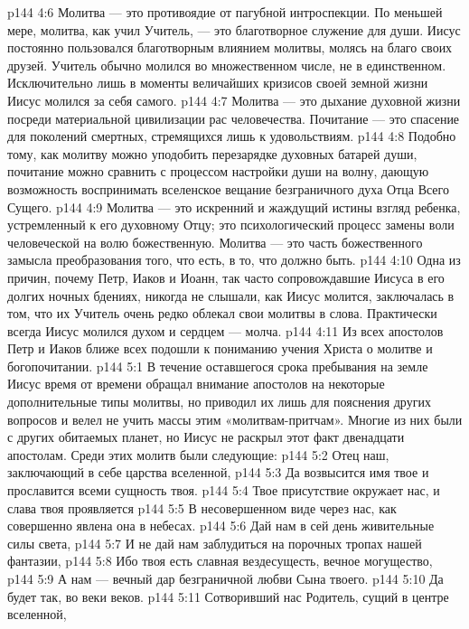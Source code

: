 \vs p144 4:6 Молитва --- это противоядие от пагубной интроспекции. По меньшей мере, молитва, как учил Учитель, --- это благотворное служение для души. Иисус постоянно пользовался благотворным влиянием молитвы, молясь на благо своих друзей. Учитель обычно молился во множественном числе, не в единственном. Исключительно лишь в моменты величайших кризисов своей земной жизни Иисус молился за себя самого.
\vs p144 4:7 Молитва --- это дыхание духовной жизни посреди материальной цивилизации рас человечества. Почитание --- это спасение для поколений смертных, стремящихся лишь к удовольствиям.
\vs p144 4:8 Подобно тому, как молитву можно уподобить перезарядке духовных батарей души, почитание можно сравнить с процессом настройки души на волну, дающую возможность воспринимать вселенское вещание безграничного духа Отца Всего Сущего.
\vs p144 4:9 Молитва --- это искренний и жаждущий истины взгляд ребенка, устремленный к его духовному Отцу; это психологический процесс замены воли человеческой на волю божественную. Молитва --- это часть божественного замысла преобразования того, что есть, в то, что должно быть.
\vs p144 4:10 Одна из причин, почему Петр, Иаков и Иоанн, так часто сопровождавшие Иисуса в его долгих ночных бдениях, никогда не слышали, как Иисус молится, заключалась в том, что их Учитель очень редко облекал свои молитвы в слова. Практически всегда Иисус молился духом и сердцем --- молча.
\vs p144 4:11 Из всех апостолов Петр и Иаков ближе всех подошли к пониманию учения Христа о молитве и богопочитании.
\vs p144 5:1 В течение оставшегося срока пребывания на земле Иисус время от времени обращал внимание апостолов на некоторые дополнительные типы молитвы, но приводил их лишь для пояснения других вопросов и велел не учить массы этим «молитвам\hyp{}притчам». Многие из них были с других обитаемых планет, но Иисус не раскрыл этот факт двенадцати апостолам. Среди этих молитв были следующие:
\vsetoff
\vs p144 5:2 Отец наш, заключающий в себе царства вселенной,
\vs p144 5:3 \hsetoff Да возвысится имя твое и прославится всеми сущность твоя.
\vs p144 5:4 Твое присутствие окружает нас, и слава твоя проявляется
\vs p144 5:5 \hsetoff В несовершенном виде через нас, как совершенно явлена она в небесах.
\vs p144 5:6 Дай нам в сей день живительные силы света,
\vs p144 5:7 \hsetoff И не дай нам заблудиться на порочных тропах нашей фантазии,
\vs p144 5:8 Ибо твоя есть славная вездесущесть, вечное могущество,
\vs p144 5:9 \hsetoff А нам --- вечный дар безграничной любви Сына твоего.
\vs p144 5:10 Да будет так, во веки веков.
\separatorline
\vs p144 5:11 Сотворивший нас Родитель, сущий в центре вселенной,
